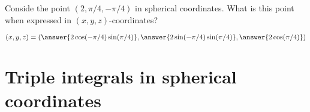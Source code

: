 \documentclass{ximera}
\begin{document}
\begin{question}
  Conside the point $(2, \pi/4,-\pi/4)$ in spherical coordinates. What is
  this point when expressed in $(x,y,z)$-coordinates?
  \begin{prompt}
    \[
    (x,y,z) = (\answer{2\cos(-\pi/4)\sin(\pi/4)}, \answer{2 \sin(-\pi/4)\sin(\pi/4)},\answer{2\cos(\pi/4)})
    \]
  \end{prompt}
\end{question}

\section{Triple integrals in spherical coordinates}
\end{document}
